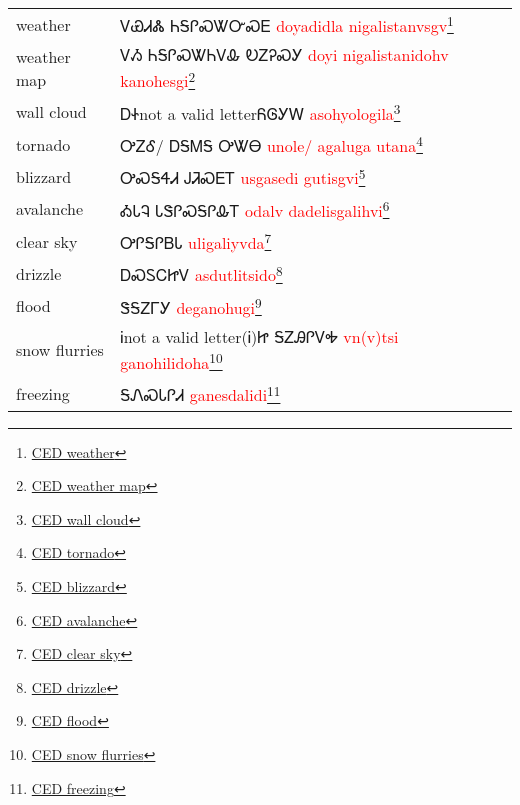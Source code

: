 \begin{minipage}{\linewidth}
\begin{tabular}{p{3cm} p{11cm}}
weather & ᏙᏯᏗᏜ ᏂᎦᎵᏍᏔᏅᏍᎬ 
 \newline \textcolor{red}{doyadidla nigalistanvsgv}\footnote{\href{https://cherokeedictionary.net/share/76306}{CED weather}}\\
weather map & ᏙᏱ ᏂᎦᎵᏍᏔᏂᏙᎲ ᎧᏃᎮᏍᎩ 
 \newline \textcolor{red}{doyi nigalistanidohv kanohesgi}\footnote{\href{https://cherokeedictionary.net/share/76304}{CED weather map}}\\
wall cloud & ᎠᏐnot a valid letterᏲᎶᎩᎳ 
 \newline \textcolor{red}{asohyologila}\footnote{\href{https://cherokeedictionary.net/share/101954}{CED wall cloud}}\\
tornado & ᎤᏃᎴ/ ᎠᎦᎷᎦ ᎤᏔᎾ 
 \newline \textcolor{red}{unole/ agaluga utana}\footnote{\href{https://cherokeedictionary.net/share/101955}{CED tornado}}\\
blizzard & ᎤᏍᎦᏎᏗ ᎫᏘᏍᎬᎢ 
 \newline \textcolor{red}{usgasedi gutisgvi}\footnote{\href{https://cherokeedictionary.net/share/101956}{CED blizzard}}\\
avalanche & ᎣᏓᎸ ᏓᏕᎵᏍᎦᎵᎲᎢ 
 \newline \textcolor{red}{odalv dadelisgalihvi}\footnote{\href{https://cherokeedictionary.net/share/101957}{CED avalanche}}\\
clear sky & ᎤᎵᎦᎵᏴᏓ 
 \newline \textcolor{red}{uligaliyvda}\footnote{\href{https://cherokeedictionary.net/share/101958}{CED clear sky}}\\
drizzle & ᎠᏍᏚᏟᏥᏙ 
 \newline \textcolor{red}{asdutlitsido}\footnote{\href{https://cherokeedictionary.net/share/101959}{CED drizzle}}\\
flood & ᏕᎦᏃᎱᎩ 
 \newline \textcolor{red}{deganohugi}\footnote{\href{https://cherokeedictionary.net/share/101960}{CED flood}}\\
snow flurries & Ꭵnot a valid letter(Ꭵ)Ꮵ  ᎦᏃᎯᎵᏙᎭ 
 \newline \textcolor{red}{vn(v)tsi  ganohilidoha}\footnote{\href{https://cherokeedictionary.net/share/101961}{CED snow flurries}}\\
freezing & ᎦᏁᏍᏓᎵᏗ 
 \newline \textcolor{red}{ganesdalidi}\footnote{\href{https://cherokeedictionary.net/share/101962}{CED freezing}}\\

\end{tabular}
\end{minipage}
